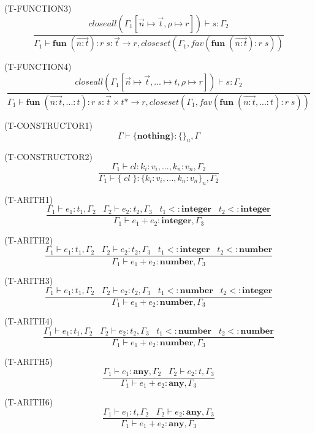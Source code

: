 \documentclass{paper}
\newcommand{\Any}{\mathbf{any}}
\newcommand{\Integer}{\mathbf{integer}}
\newcommand{\Number}{\mathbf{number}}
\newcommand{\mylabel}[1]{\; (\textsc{#1})}
\newcommand{\env}{\Gamma}
\newcommand{\subtype}{<:}
\newcommand{\ret}{\rho}
\begin{document}
\mylabel{T-FUNCTION3}
\[
\dfrac{closeall(\env_{1}[\vec{n} \mapsto \vec{t}, \ret \mapsto r]) \vdash s:\env_{2}}
      {\env_{1} \vdash \mathbf{fun} \; (\vec{n{:}t}){:}r \; s:\vec{t} \rightarrow r, closeset(\env_{1}, fav(\mathbf{fun} \; (\vec{n{:}t}){:}r \; s))}
\]

\mylabel{T-FUNCTION4}
\[
\dfrac{closeall(\env_{1}[\vec{n} \mapsto \vec{t}, {...} \mapsto t, \ret \mapsto r]) \vdash s:\env_{2}}
      {\env_{1} \vdash \mathbf{fun} \; (\vec{n{:}t},{...}{:}t){:}r \; s: \vec{t} \times t{*} \rightarrow r, closeset(\env_{1}, fav(\mathbf{fun} \; (\vec{n{:}t},{...}{:}t){:}r \; s))}
\]

\mylabel{T-CONSTRUCTOR1}
\[
\env \vdash \{ \mathbf{nothing} \}:\{ \}_{u}, \env 
\]

\mylabel{T-CONSTRUCTOR2}
\[
\dfrac{\env_{1} \vdash cl:k_{i}{:}v_{i}, ..., k_{n}{:}v_{n}, \env_{2}}
      {\env_{1} \vdash \{ \; cl \; \}:\{ k_{i}{:}v_{i}, ..., k_{n}{:}v_{n} \}_{u}, \env_{2}}
\]

\mylabel{T-ARITH1}
\[
\dfrac{\env_{1} \vdash e_{1}:t_{1}, \env_{2} \;\;\;
       \env_{2} \vdash e_{2}:t_{2}, \env_{3} \;\;\;
       t_{1} \subtype \Integer \;\;\;
       t_{2} \subtype \Integer}
      {\env_{1} \vdash e_{1} + e_{2}:\Integer, \env_{3}}
\]

\mylabel{T-ARITH2}
\[
\dfrac{\env_{1} \vdash e_{1}:t_{1}, \env_{2} \;\;\;
       \env_{2} \vdash e_{2}:t_{2}, \env_{3} \;\;\;
       t_{1} \subtype \Integer \;\;\;
       t_{2} \subtype \Number}
      {\env_{1} \vdash e_{1} + e_{2}:\Number, \env_{3}}
\]

\mylabel{T-ARITH3}
\[
\dfrac{\env_{1} \vdash e_{1}:t_{1}, \env_{2} \;\;\;
       \env_{2} \vdash e_{2}:t_{2}, \env_{3} \;\;\;
       t_{1} \subtype \Number \;\;\;
       t_{2} \subtype \Integer}
      {\env_{1} \vdash e_{1} + e_{2}:\Number, \env_{3}}
\]

\mylabel{T-ARITH4}
\[
\dfrac{\env_{1} \vdash e_{1}:t_{1}, \env_{2} \;\;\;
       \env_{2} \vdash e_{2}:t_{2}, \env_{3} \;\;\;
       t_{1} \subtype \Number \;\;\;
       t_{2} \subtype \Number}
      {\env_{1} \vdash e_{1} + e_{2}:\Number, \env_{3}}
\]

\mylabel{T-ARITH5}
\[
\dfrac{\env_{1} \vdash e_{1}:\Any, \env_{2} \;\;\;
       \env_{2} \vdash e_{2}:t, \env_{3}}
      {\env_{1} \vdash e_{1} + e_{2}:\Any, \env_{3}}
\]

\mylabel{T-ARITH6}
\[
\dfrac{\env_{1} \vdash e_{1}:t, \env_{2} \;\;\;
       \env_{2} \vdash e_{2}:\Any, \env_{3}}
      {\env_{1} \vdash e_{1} + e_{2}:\Any, \env_{3}}
\]
\end{document}
